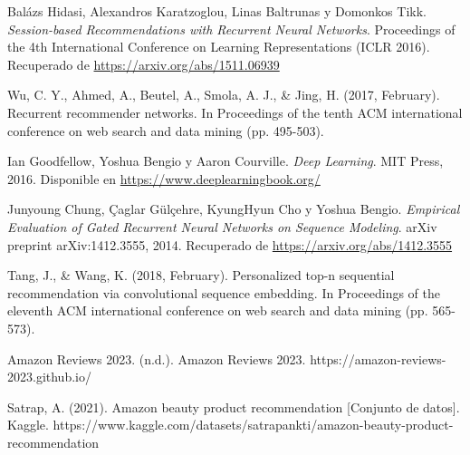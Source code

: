 \documentclass[runningheads]{llncs}
\begin{document}
\begin{thebibliography}{9}

Balázs Hidasi, Alexandros Karatzoglou, Linas Baltrunas y Domonkos Tikk.
\textit{Session-based Recommendations with Recurrent Neural Networks}. 
Proceedings of the 4th International Conference on Learning Representations (ICLR 2016). Recuperado de \url{https://arxiv.org/abs/1511.06939}

Wu, C. Y., Ahmed, A., Beutel, A., Smola, A. J., \& Jing, H. (2017, February). Recurrent recommender networks. In Proceedings of the tenth ACM international conference on web search and data mining (pp. 495-503).

Ian Goodfellow, Yoshua Bengio y Aaron Courville.
\textit{Deep Learning}. MIT Press, 2016. Disponible en \url{https://www.deeplearningbook.org/}

Junyoung Chung, Çaglar Gülçehre, KyungHyun Cho y Yoshua Bengio.
\textit{Empirical Evaluation of Gated Recurrent Neural Networks on Sequence Modeling}. arXiv preprint arXiv:1412.3555, 2014. Recuperado de \url{https://arxiv.org/abs/1412.3555}

Tang, J., \& Wang, K. (2018, February). Personalized top-n sequential recommendation via convolutional sequence embedding. In Proceedings of the eleventh ACM international conference on web search and data mining (pp. 565-573).

Amazon Reviews 2023. (n.d.). Amazon Reviews 2023. https://amazon-reviews-2023.github.io/

Satrap, A. (2021). Amazon beauty product recommendation [Conjunto de datos]. Kaggle. https://www.kaggle.com/datasets/satrapankti/amazon-beauty-product-recommendation


\end{thebibliography}
\end{document}
